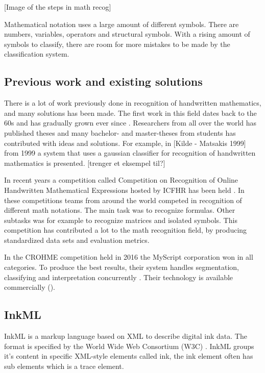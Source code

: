 \begin{figure}[H]
  \centering
  \label{steps_in_math_recog}
\end{figure}
[Image of the steps in math recog]

Mathematical notation uses a large amount of different symbols. There are numbers, variables, operators and structural symbols. With a rising amount of symbols to classify, there are room for more mistakes to be made by the classification system.

\subsection{Previous work and existing solutions}
There is a lot of work previously done in recognition of handwritten mathematics, and many solutions has been made. The first work in this field dates back to the 60s and has gradually grown ever since \cite{mouchere_icfhr2016_2016}. Researchers from all over the world has published theses and many bachelor- and master-theses from students has contributed with ideas and solutions. For example, in [Kilde - Matsakis 1999] from 1999 a system that uses a gaussian classifier for recognition of handwritten mathematics is presented. [trenger et eksempel til?]

In recent years a competition called Competition on Recognition of Online Handwritten Mathematical Expressions hosted by ICFHR has been held \cite{mouchere_icfhr2016_2016} \cite{mouchere_advancing_2016}. In these competitions teams from around the world competed in recognition of different math notations. The main task was to recognize formulas. Other subtasks was for example to recognize matrices and isolated symbols. This competition has contributed a lot to the math recognition field, by producing standardized data sets and evaluation metrics.

In the CROHME competition held in 2016 the MyScript corporation won in all categories. To produce the best results, their system handles segmentation, classifying and interpretation concurrently \cite{mouchere_icfhr2016_2016}. Their technology is available commercially (\mydate).

\subsection{InkML}
InkML is a markup language based on XML to describe digital ink data. The format is specified by the World Wide Web Consortium (W3C) \cite{chee_ink_2011}. InkML groups it's content in specific XML-style elements called ink, the ink element often has sub elements which is a trace element.\\

